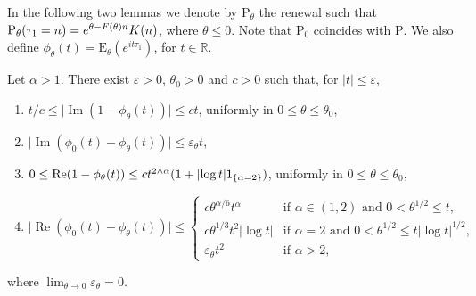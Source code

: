 \documentclass[AHL,Unicode,longabstracts]{cedram}
\DeclareMathOperator{\re}{Re}
\DeclareMathOperator{\im}{Im}
\newcommand{\bbR}{{\ensuremath{\mathbb R}}}
\newcommand{\ga}{\alpha}
\newcommand{\gep}{\varepsilon}
\newcommand{\gt}{\theta}
\newcommand\bP{\ensuremath{\mathrm{P}}}
\newcommand\bE{\ensuremath{\mathrm{E}}}
\newcommand{\ind}{{\sf 1}}
\begin{document}
In the following two lemmas we denote by $\bP_\gt$ the renewal such that $\bP_\gt(\tau_1 = n) =\linebreak e^{\gt - F(\gt) n} K(n)$, where $\gt\le 0$. Note that $\bP_0$ coincides with $\bP$. We also define $\phi_\gt(t) = \bE_\gt(e^{i t \tau_1})$, for $t\in\bbR$.

\begin{lemm}\label{lem:UnifEstimatesCFs}
Let $\ga > 1$. There exist $\gep>0$, $\gt_0>0$ and $c>0$ such that, for $|t| \le \gep$,
\begin{enumerate}
\item \label{A.9.1} $t/c \le \mathopen{|}\im(1- \phi_\gt(t))| \le ct$, uniformly in $0 \le \gt \le \gt_0$,
\item \label{A.9.2} $\mathopen{|}\im(\phi_0(t) -\phi_\gt(t))| \le \gep_\gt t$,
\item \label{A.9.3} $0 \le \re(1- \phi_\gt(t)) \le ct^{2\wedge \ga}{(1+ \mathopen{|}\log t|\ind_{\{\ga = 2\}})}$, uniformly in $0\le \gt \le \gt_0$,
\item \label{A.9.4} $\mathopen{|}\re(\phi_0(t) -\phi_\gt(t))| \le
\begin{cases}
c \gt^{\ga / 6} t^\ga& \text{if } \ga\in(1,2) \text{ and } 0 < \gt^{1/2} \le t,\\[2pt] { c \gt^{1/3} t^2 \mathopen{|}\log t|} & \text{if } \ga=2 \text{ and } 0 < \gt^{1/2} \le t\mathopen{|}\log t|^{1/2},\\[2pt]
\gep_\gt t^2& \text{if } \ga> 2,
\end{cases}$
\end{enumerate}
where $\lim_{\gt\to 0} \gep_\gt = 0$.
\end{lemm}
\end{document}
